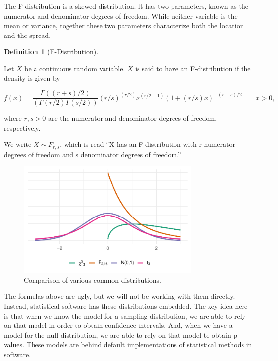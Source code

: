 \documentclass[
  letterpaper,
  DIV=11,
  numbers=noendperiod]{scrreprt}
\theoremstyle{definition}
\theoremstyle{definition}
\newtheorem{definition}{Definition}[chapter]
\theoremstyle{remark}
\begin{document}
The F-distribution is a skewed distribution. It has two parameters,
known as the numerator and denominator degrees of freedom. While neither
variable is the mean or variance, together these two parameters
characterize both the location and the spread.

\begin{definition}[F-Distribution]\protect\hypertarget{def-f-distribution}{}\label{def-f-distribution}

Let \(X\) be a continuous random variable. \(X\) is said to have an
F-distribution if the density is given by

\[f(x) = \frac{\Gamma((r + s)/2)}{(\Gamma(r/2) \Gamma(s/2))} (r/s)^{(r/2)} x^{(r/2 - 1)} (1 + (r/s) x)^{-(r + s)/2} \qquad x > 0,\]

where \(r,s > 0\) are the numerator and denominator degrees of freedom,
respectively.

We write \(X \sim F_{r, s}\), which is read ``X has an F-distribution
with r numerator degrees of freedom and s denominator degrees of
freedom.''

\end{definition}

\begin{figure}

{\centering \includegraphics[width=0.8\textwidth,height=\textheight]{./images/fig-essential-probability-comparisons-1.pdf}

}

\caption{\label{fig-essential-probability-comparisons}Comparison of
various common distributions.}

\end{figure}

The formulas above are ugly, but we will not be working with them
directly. Instead, statistical software has these distributions
embedded. The key idea here is that when we know the model for a
sampling distribution, we are able to rely on that model in order to
obtain confidence intervals. And, when we have a model for the null
distribution, we are able to rely on that model to obtain p-values.
These models are behind default implementations of statistical methods
in software.
\end{document}
